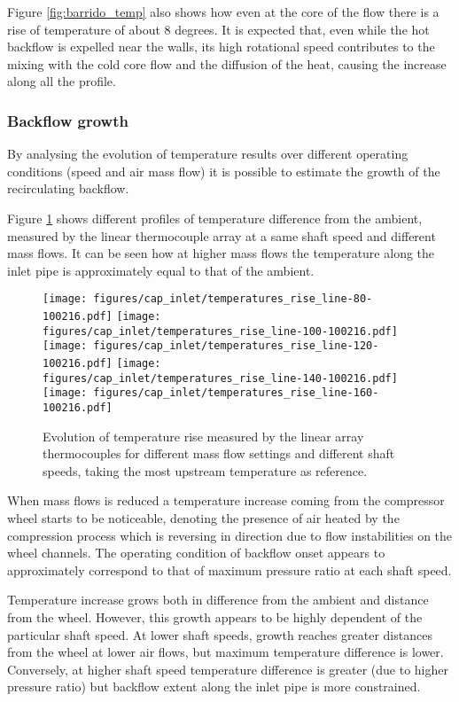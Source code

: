 Figure \ref{fig:barrido_temp} also shows how even at the core of the flow there is a rise of temperature of about 8 degrees. It is expected that, even while the hot backflow is expelled near the walls, its high rotational speed contributes to the mixing with the cold core flow and the diffusion of the heat, causing the increase along all the profile.

\subsubsection{Backflow growth}

By analysing the evolution of temperature results over different operating conditions (speed and air mass flow) it is possible to estimate the growth of the recirculating backflow.

Figure \ref{fig:temp_line_linear} shows different profiles of temperature difference from the ambient, measured by the linear thermocouple array at a same shaft speed and different mass flows. It can be seen how at higher mass flows the temperature along the inlet pipe is approximately equal to that of the ambient.

\begin{figure}[htb!]
\centering
\texttt{[image: figures/cap\_inlet/temperatures\_rise\_line-80-100216.pdf]}
\texttt{[image: figures/cap\_inlet/temperatures\_rise\_line-100-100216.pdf]}\\[4mm]
\texttt{[image: figures/cap\_inlet/temperatures\_rise\_line-120-100216.pdf]}
\texttt{[image: figures/cap\_inlet/temperatures\_rise\_line-140-100216.pdf]}\\[4mm]
\texttt{[image: figures/cap\_inlet/temperatures\_rise\_line-160-100216.pdf]}
\caption{Evolution of temperature rise measured by the linear array thermocouples for different mass flow settings and different shaft speeds, taking the most upstream temperature as reference.}
\label{fig:temp_line_linear}
\end{figure}

When mass flows is reduced a temperature increase coming from the compressor wheel starts to be noticeable, denoting the presence of air heated by the compression process which is reversing in direction due to flow instabilities on the wheel channels. The operating condition of backflow onset appears to approximately correspond to that of maximum pressure ratio at each shaft speed.

Temperature increase grows both in difference from the ambient and distance from the wheel. However, this growth appears to be highly dependent of the particular shaft speed. At lower shaft speeds, growth reaches greater distances from the wheel at lower air flows, but maximum temperature difference is lower. Conversely, at higher shaft speed temperature difference is greater (due to higher pressure ratio) but backflow extent along the inlet pipe is more constrained.

